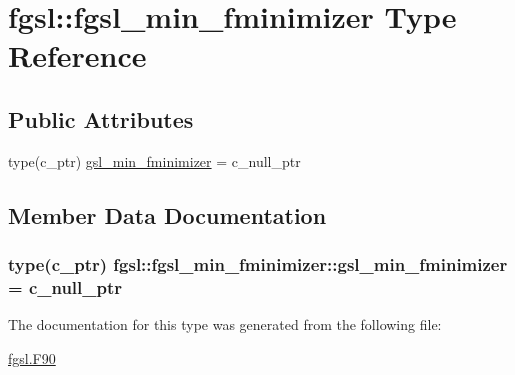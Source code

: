 \hypertarget{structfgsl_1_1fgsl__min__fminimizer}{\section{fgsl\-:\-:fgsl\-\_\-min\-\_\-fminimizer Type Reference}
\label{structfgsl_1_1fgsl__min__fminimizer}
}
\subsection*{Public Attributes}
\begin{DoxyCompactItemize}
\item 
type(c\-\_\-ptr) \hyperlink{structfgsl_1_1fgsl__min__fminimizer_a98d1cf001ea5a9c37bfc707481a7c367}{gsl\-\_\-min\-\_\-fminimizer} = c\-\_\-null\-\_\-ptr
\end{DoxyCompactItemize}


\subsection{Member Data Documentation}
\hypertarget{structfgsl_1_1fgsl__min__fminimizer_a98d1cf001ea5a9c37bfc707481a7c367}{
\subsubsection[{gsl\-\_\-min\-\_\-fminimizer}]{\setlength{\rightskip}{0pt plus 5cm}type(c\-\_\-ptr) fgsl\-::fgsl\-\_\-min\-\_\-fminimizer\-::gsl\-\_\-min\-\_\-fminimizer = c\-\_\-null\-\_\-ptr}}\label{structfgsl_1_1fgsl__min__fminimizer_a98d1cf001ea5a9c37bfc707481a7c367}


The documentation for this type was generated from the following file\-:\begin{DoxyCompactItemize}
\item 
\hyperlink{fgsl_8F90}{fgsl.\-F90}\end{DoxyCompactItemize}
